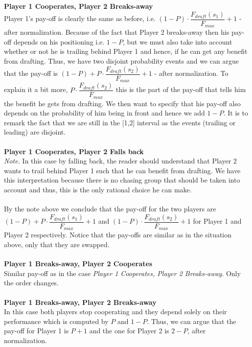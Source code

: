 \documentclass[10pt, a4paper]{report}
\begin{document}
\\\\
\textbf{Player 1 Cooperates, Player 2 Breaks-away}
\\
Player 1's pay-off is clearly the same as before, i.e. $(1-P)\cdot \dfrac{F_{draft}(s_1)}{F_{max}} + 1$ - after normalization. Because of the fact that Player 2 breaks-away then his pay-off depends on his positioning i.e. $1-P$, but we must also take into account whether or not he is trailing behind Player 1 and hence, if he can get any benefit from drafting. Thus, we have two disjoint probability events and we can argue that the pay-off is $(1-P) +  P\cdot \dfrac{F_{draft}(s_2)}{F_{max}} + 1$ - after normalization. To explain it a bit more, $P\cdot \dfrac{F_{draft}(s_2)}{F_{max}}$ this is the part of the pay-off that tells him the benefit he gets from drafting. We then want to specify that his pay-off also depends on the probability of him being in front and hence we add $1-P$. It is to remark the fact that we are still in the [1,2] interval as the events (trailing or leading) are disjoint.
\\\\
\textbf{Player 1 Cooperates, Player 2 Falls back}
\\
\textit{Note.} In this case by falling back, the reader should understand that Player 2 wants to trail behind Player 1 such that he can benefit from drafting. We have this interpretation because there is no chasing group that should be taken into account and thus, this is the only rational choice he can make.
\\\\
By the note above we conclude that the pay-off for the two players are $(1-P) +  P\cdot \dfrac{F_{draft}(s_1)}{F_{max}} + 1$ and $(1-P)\cdot \dfrac{F_{draft}(s_2)}{F_{max}} + 1$ for Player 1 and Player 2 respectively. Notice that the pay-offs are similar as in the situation above, only that they are swapped.
\\\\
\textbf{Player 1 Breaks-away, Player 2 Cooperates}
\\
Similar pay-off as in the case \textit{Player 1 Cooperates, Player 2 Breaks-away}. Only the order changes.
\\\\
\textbf{Player 1 Breaks-away, Player 2 Breaks-away}
\\
In this case both players stop cooperating and they depend solely on their performance which is computed by $P$ and $1-P$. Thus, we can argue that the pay-off for Player 1 is $P+1$ and the one for Player 2 is $2-P$, after normalization.
\end{document}
